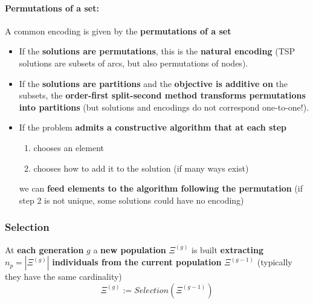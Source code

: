 \newpage

\paragraph{Permutations of a set:} A common encoding is given by the \textbf{permutations of a set}
\begin{itemize}
	\item If the \textbf{solutions are permutations}, this is the \textbf{natural encoding} (TSP solutions are subsets of arcs, but also permutations of nodes).\\
	
	\item If the \textbf{solutions are partitions} and the \textbf{objective is additive on} the subsets, the \textbf{order-first split-second method transforms permutations into partitions} (but solutions and encodings do not correspond one-to-one!).\\
	
	\item If the problem \textbf{admits a constructive algorithm that at each step}
	\begin{enumerate}
		\item chooses an element
		\item chooses how to add it to the solution (if many ways exist)
	\end{enumerate}
	we can \textbf{feed elements to the algorithm following the permutation} (if step 2 is not unique, some solutions could have no encoding)
\end{itemize}

\newpage

\subsubsection{Selection}

At \textbf{each generation} $g$ a \textbf{new population} $\Xi^{(g)}$ is built \textbf{extracting} $n_p = |\Xi^{(g )}|$ \textbf{individuals from the current population} $\Xi^{(g-1)}$ (typically they have the same cardinality)
$$ \Xi^{(g )} := Selection(\Xi^{(g −1)}) $$


